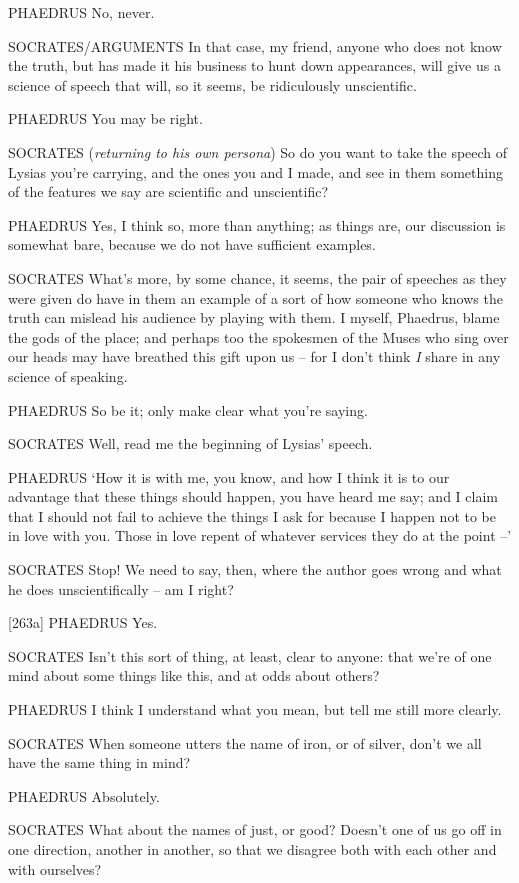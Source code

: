 PHAEDRUS No, never.

 SOCRATES/ARGUMENTS In that case, my friend, anyone who does not
know the truth, but has made it his business to hunt down appearances,
will give us a science of speech that will, so it seems, be ridiculously
unscientific.

PHAEDRUS You may be right.

 SOCRATES ({\em returning to his own persona}) So do you want to
take the speech of Lysias you're carrying, and the ones you and I
made, and see in them
something of the features we say are scientific and unscientific?

PHAEDRUS Yes, I think so, more than anything; as things are, our
discussion is somewhat bare, because we do not have sufficient examples.

 SOCRATES What's more, by some chance, it seems, the pair of
 speeches as
they were given do have in them an example of a sort of how someone who
knows the truth can mislead his audience by playing with
them. I myself,
Phaedrus, blame the gods of the place; and perhaps too the spokesmen of
the Muses  who sing over our heads may have breathed this gift
upon us -- for I don't think {\em I} share in any science of speaking.

PHAEDRUS So be it; only make clear what you're saying.

SOCRATES Well, read me the beginning of Lysias' speech.

 PHAEDRUS ‘How it is with me, you know, and how I think it is to
our advantage that these things should happen, you have heard me say;
and I claim that I should not fail to achieve the things I ask for
because I happen not to be in love with you. Those in love repent of
whatever services they do at the point --'

 SOCRATES Stop! We need to say, then, where the author goes
wrong and what he does unscientifically -- am I right?

{[}263a{]} PHAEDRUS Yes.

SOCRATES Isn't this sort of thing, at least, clear to anyone: that we're
of one mind about some things like this, and at odds about others?

 PHAEDRUS I think I understand what you mean, but tell me still
more clearly.

SOCRATES When someone utters the name of iron, or of silver, don't we
all have the same thing in mind?

PHAEDRUS Absolutely.

SOCRATES What about the names of just, or
good? Doesn't one of us
go off in one direction, another in another, so that  we
disagree both with each other and with ourselves?


